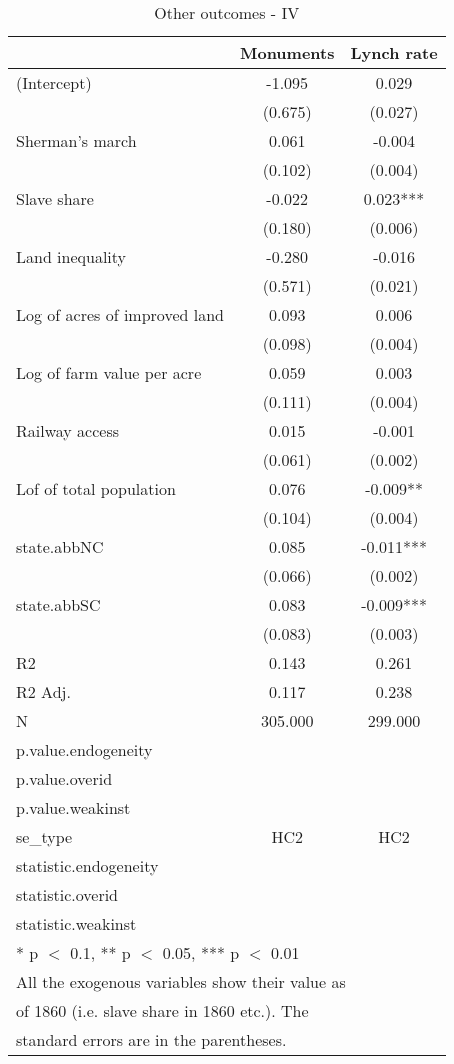 \begin{table}

\caption{\label{tab:}Other outcomes - IV}
\centering
\begin{tabular}[t]{lcc}
\toprule
  & Monuments & Lynch rate\\
\midrule
(Intercept) & -1.095 & 0.029\\
 & (0.675) & (0.027)\\
Sherman's march & 0.061 & -0.004\\
 & (0.102) & (0.004)\\
Slave share & -0.022 & 0.023***\\
 & (0.180) & (0.006)\\
Land inequality & -0.280 & -0.016\\
 & (0.571) & (0.021)\\
Log of acres of improved land & 0.093 & 0.006\\
 & (0.098) & (0.004)\\
Log of farm value per acre & 0.059 & 0.003\\
 & (0.111) & (0.004)\\
Railway access & 0.015 & -0.001\\
 & (0.061) & (0.002)\\
Lof of total population & 0.076 & -0.009**\\
 & (0.104) & (0.004)\\
state.abbNC & 0.085 & -0.011***\\
 & (0.066) & (0.002)\\
state.abbSC & 0.083 & -0.009***\\
 & (0.083) & (0.003)\\
\midrule
R2 & 0.143 & 0.261\\
R2 Adj. & 0.117 & 0.238\\
N & 305.000 & 299.000\\
p.value.endogeneity &  & \\
p.value.overid &  & \\
p.value.weakinst &  & \\
se\_type & HC2 & HC2\\
statistic.endogeneity &  & \\
statistic.overid &  & \\
statistic.weakinst &  & \\
\bottomrule
\multicolumn{3}{l}{\textsuperscript{} * p $<$ 0.1, ** p $<$ 0.05, *** p $<$ 0.01}\\
\multicolumn{3}{l}{\textsuperscript{} All the exogenous variables show their value as}\\
\multicolumn{3}{l}{of 1860 (i.e. slave share in 1860 etc.). The}\\
\multicolumn{3}{l}{standard errors are in the parentheses.}\\
\end{tabular}
\end{table}
